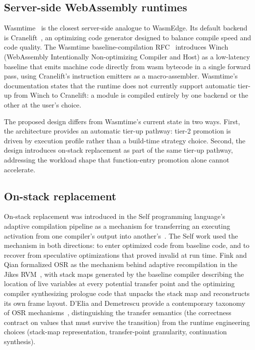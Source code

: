 \subsection{Server-side WebAssembly runtimes}
\label{sec:bg:related:server}

Wasmtime~\cite{wasmtime-docs} is the closest server-side analogue to WasmEdge. Its default backend is Cranelift~\cite{cranelift}, an optimizing code generator designed to balance compile speed and code quality. The Wasmtime baseline-compilation RFC~\cite{wasmtime-baseline-rfc} introduces Winch (WebAssembly Intentionally Non-optimizing Compiler and Host) as a low-latency baseline that emits machine code directly from wasm bytecode in a single forward pass, using Cranelift's instruction emitters as a macro-assembler. Wasmtime's documentation states that the runtime does not currently support automatic tier-up from Winch to Cranelift: a module is compiled entirely by one backend or the other at the user's choice.

The proposed design differs from Wasmtime's current state in two ways. First, the architecture provides an automatic tier-up pathway: tier-2 promotion is driven by execution profile rather than a build-time strategy choice. Second, the design introduces on-stack replacement as part of the same tier-up pathway, addressing the workload shape that function-entry promotion alone cannot accelerate.

\subsection{On-stack replacement}
\label{sec:bg:related:osr}

On-stack replacement was introduced in the Self programming language's adaptive compilation pipeline as a mechanism for transferring an executing activation from one compiler's output into another's~\cite{holzle1992deopt}. The Self work used the mechanism in both directions: to enter optimized code from baseline code, and to recover from speculative optimizations that proved invalid at run time. Fink and Qian formalized OSR as the mechanism behind adaptive recompilation in the Jikes RVM~\cite{fink2003osr}, with stack maps generated by the baseline compiler describing the location of live variables at every potential transfer point and the optimizing compiler synthesizing prologue code that unpacks the stack map and reconstructs its own frame layout. D'Elia and Demetrescu provide a contemporary taxonomy of OSR mechanisms~\cite{delia2018osr}, distinguishing the transfer semantics (the correctness contract on values that must survive the transition) from the runtime engineering choices (stack-map representation, transfer-point granularity, continuation synthesis).


